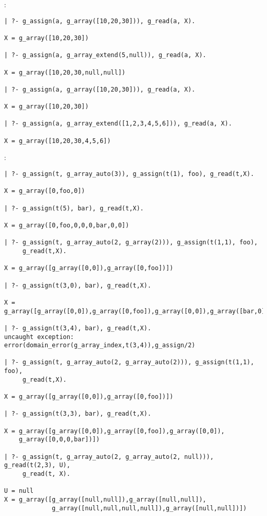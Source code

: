 :

\begin{Indentation}
\begin{verbatim}
| ?- g_assign(a, g_array([10,20,30])), g_read(a, X).

X = g_array([10,20,30])

| ?- g_assign(a, g_array_extend(5,null)), g_read(a, X).

X = g_array([10,20,30,null,null])

| ?- g_assign(a, g_array([10,20,30])), g_read(a, X).

X = g_array([10,20,30])

| ?- g_assign(a, g_array_extend([1,2,3,4,5,6])), g_read(a, X).

X = g_array([10,20,30,4,5,6])
\end{verbatim}
\end{Indentation}

:

\begin{Indentation}
\begin{verbatim}
| ?- g_assign(t, g_array_auto(3)), g_assign(t(1), foo), g_read(t,X).

X = g_array([0,foo,0])

| ?- g_assign(t(5), bar), g_read(t,X).

X = g_array([0,foo,0,0,0,bar,0,0])

| ?- g_assign(t, g_array_auto(2, g_array(2))), g_assign(t(1,1), foo),
     g_read(t,X).

X = g_array([g_array([0,0]),g_array([0,foo])])

| ?- g_assign(t(3,0), bar), g_read(t,X).

X = g_array([g_array([0,0]),g_array([0,foo]),g_array([0,0]),g_array([bar,0])])

| ?- g_assign(t(3,4), bar), g_read(t,X).
uncaught exception: error(domain_error(g_array_index,t(3,4)),g_assign/2)

| ?- g_assign(t, g_array_auto(2, g_array_auto(2))), g_assign(t(1,1), foo),
     g_read(t,X).

X = g_array([g_array([0,0]),g_array([0,foo])])

| ?- g_assign(t(3,3), bar), g_read(t,X).

X = g_array([g_array([0,0]),g_array([0,foo]),g_array([0,0]),
    g_array([0,0,0,bar])])

| ?- g_assign(t, g_array_auto(2, g_array_auto(2, null))), g_read(t(2,3), U),
     g_read(t, X).

U = null
X = g_array([g_array([null,null]),g_array([null,null]),
             g_array([null,null,null,null]),g_array([null,null])])
\end{verbatim}
\end{Indentation}

